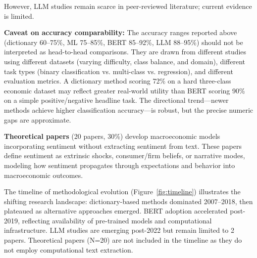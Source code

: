 \documentclass[11pt,twocolumn]{article}
\begin{document}
However, LLM studies remain scarce in peer-reviewed literature; current evidence is limited.

\textbf{Caveat on accuracy comparability:} The accuracy ranges reported above (dictionary 60--75\%, ML 75--85\%, BERT 85--92\%, LLM 88--95\%) should not be interpreted as head-to-head comparisons. They are drawn from different studies using different datasets (varying difficulty, class balance, and domain), different task types (binary classification vs. multi-class vs. regression), and different evaluation metrics. A dictionary method scoring 72\% on a hard three-class economic dataset may reflect greater real-world utility than BERT scoring 90\% on a simple positive/negative headline task. The directional trend---newer methods achieve higher classification accuracy---is robust, but the precise numeric gaps are approximate.

\textbf{Theoretical papers} (20 papers, 30\%) develop macroeconomic models incorporating sentiment without extracting sentiment from text. These papers define sentiment as extrinsic shocks, consumer/firm beliefs, or narrative modes, modeling how sentiment propagates through expectations and behavior into macroeconomic outcomes.

The timeline of methodological evolution (Figure~\ref{fig:timeline}) illustrates the shifting research landscape: dictionary-based methods dominated 2007--2018, then plateaued as alternative approaches emerged. BERT adoption accelerated post-2019, reflecting availability of pre-trained models and computational infrastructure. LLM studies are emerging post-2022 but remain limited to 2 papers. Theoretical papers (N=20) are not included in the timeline as they do not employ computational text extraction.
\end{document}
